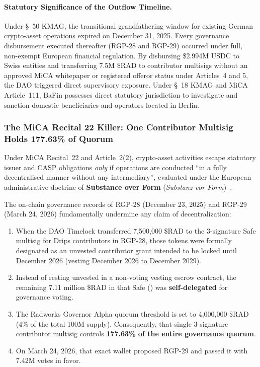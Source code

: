 \documentclass[a4paper,11pt,twoside,parskip=half-,headings=small]{scrartcl}
\begin{document}
\paragraph{Statutory Significance of the Outflow Timeline.} Under \S~50 KMAG, the transitional grandfathering window for existing German crypto-asset operations expired on December 31, 2025. Every governance disbursement executed thereafter (RGP-28 and RGP-29) occurred under full, non-exempt European financial regulation. By disbursing \$2.994M USDC to Swiss entities and transferring 7.5M \$RAD to contributor multisigs without an approved MiCA whitepaper or registered offeror status under Articles~4 and 5, the DAO triggered direct supervisory exposure. Under \S~18 KMAG and MiCA Article~111, BaFin possesses direct statutory jurisdiction to investigate and sanction domestic beneficiaries and operators located in Berlin.

\clearpage

\subsubsection{The MiCA Recital 22 Killer: One Contributor Multisig Holds 177.63\% of Quorum}
\label{sec:mica_recital_22_killer}

Under MiCA Recital~22 and Article~2(2), crypto-asset activities escape statutory issuer and CASP obligations \emph{only} if operations are conducted ``in a fully decentralised manner without any intermediary'', evaluated under the European administrative doctrine of \textbf{Substance over Form} (\emph{Substanz vor Form})~\cite{mica2023}.

The on-chain governance records of RGP-28 (December 23, 2025) and RGP-29 (March 24, 2026) fundamentally undermine any claim of decentralization:
\begin{enumerate}[nosep]
  \item When the DAO Timelock transferred 7,500,000 \$RAD to the 3-signature Safe multisig for Drips contributors in RGP-28, those tokens were formally designated as an unvested contributor grant intended to be locked until December 2026 (vesting December 2026 to December 2029).
  \item Instead of resting unvested in a non-voting vesting escrow contract, the remaining 7.11 million \$RAD in that Safe () was \textbf{self-delegated} for governance voting.
  \item The Radworks Governor Alpha quorum threshold is set to 4,000,000 \$RAD (4\% of the total 100M supply). Consequently, that single 3-signature contributor multisig controls \textbf{177.63\% of the entire governance quorum}.
  \item On March 24, 2026, that exact wallet proposed RGP-29 and passed it with 7.42M votes in favor.
\end{enumerate}
\end{document}
